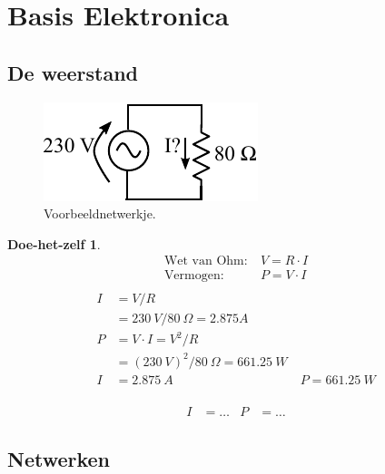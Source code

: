 \documentclass{article}
\newtheorem{DIY}{Doe-het-zelf}
\begin{document}
	
	\maketitle

	\tableofcontents
	\clearpage

	\section{Basis Elektronica}
	\subsection{De weerstand}
			\begin{figure}[h!]
				\centering
				\includegraphics{vbweerstand.pdf}
				\caption{Voorbeeldnetwerkje.}
				\label{fig:vbweerstand}
			\end{figure}

			\begin{DIY} 
			\begin{align*}
				\text{Wet van Ohm:}~&V = R\cdot I \\
				\text{Vermogen:}~&P = V\cdot I \\
			\end{align*}
			\ifoplossing
				\begin{align*}
				    I &= V/R \\ &= 230~V/80~\Omega = 2.875 A \\
				    P &= V \cdot I = V^2/R \\ &= (230~V)^2/80~\Omega = 661.25~W \\
				    I&= 2.875~A \hspace{10em}P=  661.25~W 
				\end{align*}
			\else
				~\vspace{20ex}
				\begin{align*}
			    I&= \ldots & P&= \ldots 
				\end{align*}
			\fi



			
			\end{DIY}

	\subsection{Netwerken}
\end{document}

